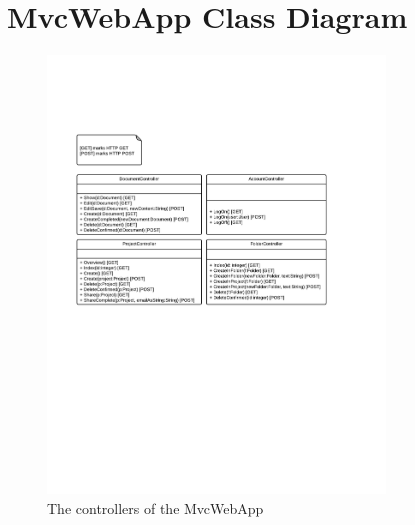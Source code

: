 \section{MvcWebApp Class Diagram}
\label{sec:mvc-class-diagram}

\begin{figure}[htb]
    \centering
    \includegraphics[width=0.8\textwidth]{Software_design/graphics/MvcWebApp.png}
    \caption{The controllers of the MvcWebApp}
    \label{fig:mvcwebapp-diagram}
\end{figure}
